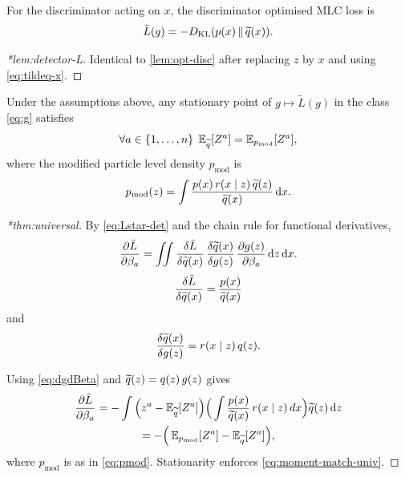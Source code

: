 \begin{theorem}
\noproofref
For the discriminator acting on $x$, the discriminator optimised MLC loss is
\begin{equation}
    \tilde L(g) = - D_{\mathrm{KL}} \qty(p(x)\,\|\,\widetilde{q}(x)).
\end{equation}
\end{theorem}

\begin{proof}[*lem:detector-L]
Identical to \cref{lem:opt-disc} after replacing $z$ by $x$ and using \cref{eq:tildeq-x}.
\end{proof}

\begin{theorem}
\noproofref
Under the assumptions above, any stationary point of $g\mapsto \tilde L(g)$ in the class \cref{eq:g} satisfies
\begin{equation}
    \forall a\in \qty{1, \dots, n}\;\operatorname{\mathbb{E}}_{\widetilde{q}}[Z^a] = \operatorname{\mathbb{E}}_{p_{\mathrm{mod}}}[Z^a],
\end{equation}
where the modified particle level density $p_{\mathrm{mod}}$ is
\begin{equation}
    p_{\mathrm{mod}}(z) = \int \frac{p(x)\,r(x\mid z)\,\widetilde{q}(z)}{\widetilde{q}(x)}\,\dd x.
\end{equation}
\end{theorem}

\begin{proof}[*thm:universal]
By \cref{eq:Lstar-det} and the chain rule for functional derivatives,
\[
\frac{\partial \tilde L}{\partial \beta_a}
=\iint \frac{\delta \tilde L}{\delta \widetilde{q}(x)}\,
      \frac{\delta \widetilde{q}(x)}{\delta g(z)}\,
      \frac{\partial g(z)}{\partial \beta_a}\,\dd z\,\dd x.
\]
\[\frac{\delta \tilde L}{\delta \widetilde{q}(x)}=\frac{p(x)}{\widetilde{q}(x)}
\]
and
\[
    \frac{\delta \widetilde{q}(x)}{\delta g(z)} = r(x\mid z)\,q(z).
\]

Using \cref{eq:dgdBeta} and $\widetilde{q}(z)=q(z)\,g(z)$ gives
\begin{gather}
\frac{\partial \tilde L}{\partial \beta_a}
= -\int \Big(z^a-\operatorname{\mathbb{E}}_{\widetilde{q}}[Z^a]\Big)
       \Big(\int \frac{p(x)}{\widetilde{q}(x)}\,r(x\mid z)\,dx\Big)\widetilde{q}(z)\,\dd z\\
= -\Big(\operatorname{\mathbb{E}}_{p_{\mathrm{mod}}}[Z^a]-\operatorname{\mathbb{E}}_{\widetilde{q}}[Z^a]\Big),
\end{gather}
where $p_{\mathrm{mod}}$ is as in \cref{eq:pmod}. Stationarity enforces \cref{eq:moment-match-univ}.
\end{proof}

